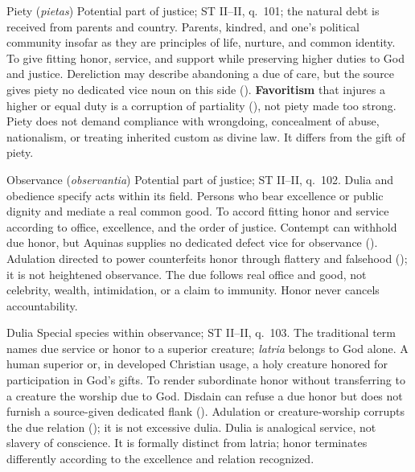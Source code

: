 \virtuedossier
  {Piety (\emph{pietas})}
  {Potential part of justice; ST II--II, q.~101; the natural debt is received from parents and country.}
  {Parents, kindred, and one's political community insofar as they are principles of life, nurture, and common identity.}
  {To give fitting honor, service, and support while preserving higher duties to God and justice.}
  {Dereliction may describe abandoning a due of care, but the source gives piety no dedicated vice noun on this side ().}
  {\textbf{Favoritism} that injures a higher or equal duty is a corruption of partiality (), not piety made too strong.}
  {Piety does not demand compliance with wrongdoing, concealment of abuse, nationalism, or treating inherited custom as divine law. It differs from the gift of piety.}

\virtuedossier
  {Observance (\emph{observantia})}
  {Potential part of justice; ST II--II, q.~102. Dulia and obedience specify acts within its field.}
  {Persons who bear excellence or public dignity and mediate a real common good.}
  {To accord fitting honor and service according to office, excellence, and the order of justice.}
  {Contempt can withhold due honor, but Aquinas supplies no dedicated defect vice for observance ().}
  {Adulation directed to power counterfeits honor through flattery and falsehood (); it is not heightened observance.}
  {The due follows real office and good, not celebrity, wealth, intimidation, or a claim to immunity. Honor never cancels accountability.}


\virtuedossier
  {Dulia}
  {Special species within observance; ST II--II, q.~103. The traditional term names due service or honor to a superior creature; \emph{latria} belongs to God alone.}
  {A human superior or, in developed Christian usage, a holy creature honored for participation in God's gifts.}
  {To render subordinate honor without transferring to a creature the worship due to God.}
  {Disdain can refuse a due honor but does not furnish a source-given dedicated flank ().}
  {Adulation or creature-worship corrupts the due relation (); it is not excessive dulia.}
  {Dulia is analogical service, not slavery of conscience. It is formally distinct from latria; honor terminates differently according to the excellence and relation recognized.}


